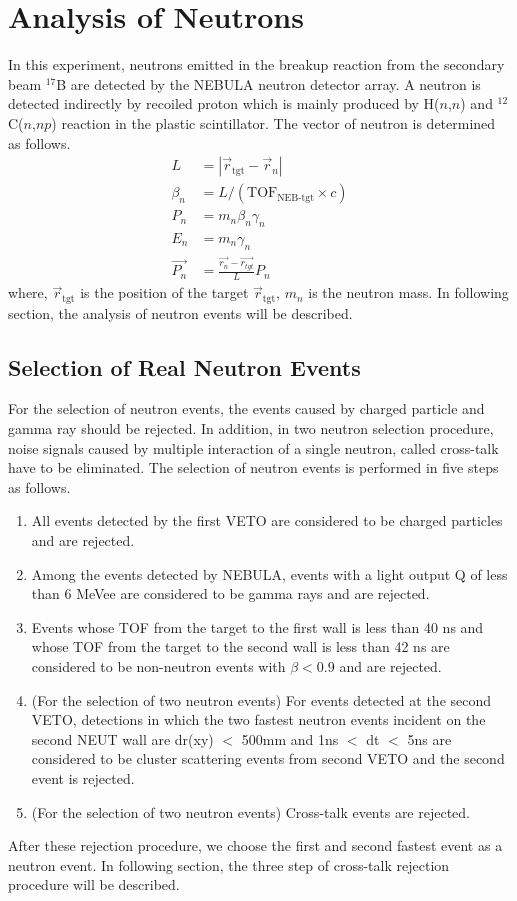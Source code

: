 \clearpage

\section{Analysis of Neutrons}
In this experiment, neutrons emitted in the breakup reaction from the secondary beam ${}^{17}$B are detected by the NEBULA neutron detector array. A neutron is detected indirectly by recoiled proton which is mainly produced by H($n$,$n$) and ${}^{12}$C($n$,$np$) reaction in the plastic scintillator. The vector of neutron is determined as follows.
\begin{align}
    L &= | \vec{r}_{\text{tgt}} - \vec{r}_{n} | \\
    \beta_{n} &= L / (\text{TOF}_{\text{NEB-tgt}} \times c) \\
    P_{n} &= m_{n} \beta_{n} \gamma_{n} \\
    E_{n} &= m_{n} \gamma_{n} \\
    \vec{P_{n}} &= \frac{\vec{r_{n}} - \vec{r_{tgt}}}{L} P_{n}
\end{align}
where, $\vec{r}_{\text{tgt}}$ is the position of the target $\vec{r}_{\text{tgt}}$, $m_{n}$ is the neutron mass. In following section, the analysis of neutron events will be described.

\subsection {Selection of Real Neutron Events}
For the selection of neutron events, the events caused by charged particle and gamma ray should be rejected. In addition, in two neutron selection procedure, noise signals caused by multiple interaction of a single neutron, called cross-talk have to be eliminated. The selection of neutron events is performed in five steps as follows. 
\begin{enumerate}
    \item All events detected by the first VETO are considered to be charged particles and are rejected.
    \item Among the events detected by NEBULA, events with a light output Q of less than 6 MeVee are considered to be gamma rays and are rejected.
    \item Events whose TOF from the target to the first wall is less than 40 ns and whose TOF from the target to the second wall is less than 42 ns are considered to be non-neutron events with $\beta < 0.9$ and are rejected.
    \item (For the selection of two neutron events) For events detected at the second VETO, detections in which the two fastest neutron events incident on the second NEUT wall are dr(xy) $<$ 500mm and 1ns $<$ dt $<$ 5ns are considered to be cluster scattering events from second VETO and the second event is rejected.
    \item (For the selection of two neutron events) Cross-talk events are rejected.
\end{enumerate}
After these rejection procedure, we choose the first and second fastest event as a neutron event. In following section, the three step of cross-talk rejection procedure will be described.

